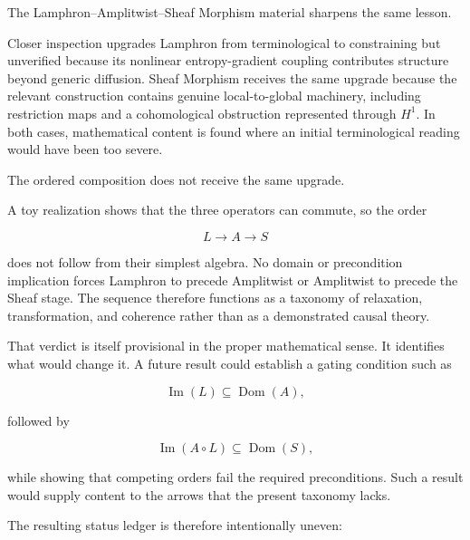 \documentclass[11pt]{article}
\begin{document}
The Lamphron--Amplitwist--Sheaf Morphism material sharpens the same lesson.

Closer inspection upgrades Lamphron from terminological to constraining but unverified because its nonlinear entropy-gradient coupling contributes structure beyond generic diffusion. Sheaf Morphism receives the same upgrade because the relevant construction contains genuine local-to-global machinery, including restriction maps and a cohomological obstruction represented through $H^1$. In both cases, mathematical content is found where an initial terminological reading would have been too severe.

The ordered composition does not receive the same upgrade.

A toy realization shows that the three operators can commute, so the order

\begin{equation}
L\to A\to S
\end{equation}

does not follow from their simplest algebra. No domain or precondition implication forces Lamphron to precede Amplitwist or Amplitwist to precede the Sheaf stage. The sequence therefore functions as a taxonomy of relaxation, transformation, and coherence rather than as a demonstrated causal theory.

That verdict is itself provisional in the proper mathematical sense. It identifies what would change it. A future result could establish a gating condition such as

\begin{equation}
\operatorname{Im}(L)
\subseteq
\operatorname{Dom}(A),
\end{equation}

followed by

\begin{equation}
\operatorname{Im}(A\circ L)
\subseteq
\operatorname{Dom}(S),
\end{equation}

while showing that competing orders fail the required preconditions. Such a result would supply content to the arrows that the present taxonomy lacks.

The resulting status ledger is therefore intentionally uneven:
\end{document}
